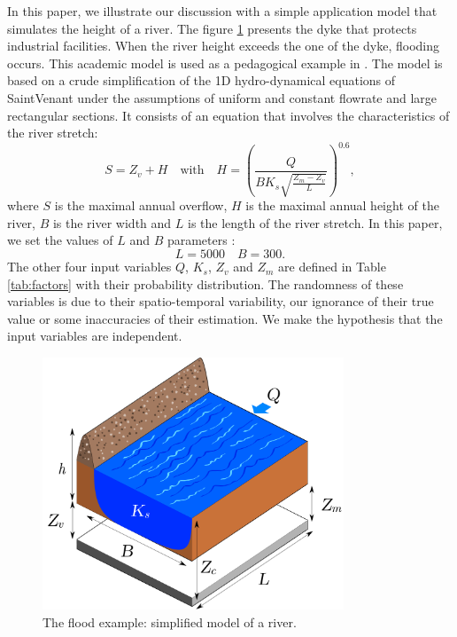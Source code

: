 \documentclass{article}
\begin{document}
In this paper, we illustrate our discussion with a simple application model that simulates 
the height of a river. 
The figure \ref{fig:crues} presents the dyke that protects industrial facilities. 
When the river height exceeds the one of the dyke, flooding occurs. 
This academic model is used as a pedagogical example in \cite{ioolem15}.
The model is based on a crude simplification of the 1D hydro-dynamical equations of SaintVenant 
under the assumptions of uniform and constant flowrate and large rectangular sections. 
It consists of an equation that involves the characteristics of the river stretch:
\begin{equation}\label{eq:cruesS}
S = Z_v + H \quad \mbox{with} \quad 
H = \left(\frac{Q}{B K_s \sqrt{\frac{Z_m-Z_v}{L} }} \right)^{0.6},
\end{equation}
where $S$ is the maximal annual overflow, $H$ is the maximal annual height of the river, 
$B$ is the river width and $L$ is the length of the river stretch. 
In this paper, we set the values of $L$ and $B$ parameters :
$$
L = 5000 \quad B = 300.
$$
The other four input variables $Q$, $K_s$, $Z_v$ and $Z_m$ are defined in Table \ref{tab:factors} 
with their  probability distribution.
The randomness of these variables is due to their spatio-temporal variability, our ignorance of 
their true value or some inaccuracies of their estimation. 
We make the hypothesis that the input variables are independent.

\begin{figure}
\begin{center}
    \includegraphics[width=9cm]{figures/river_section_large_adjusted} 
\end{center}
\caption{The flood example: simplified model of a river.}\label{fig:crues}
\end{figure}
\end{document}
